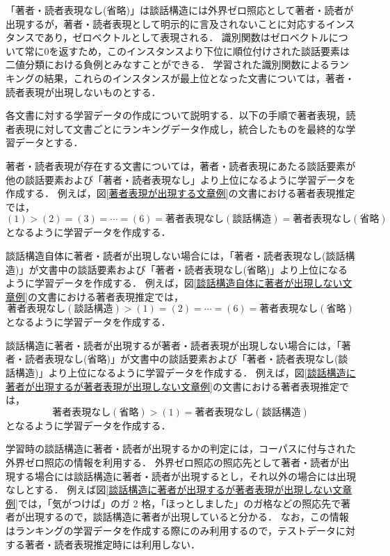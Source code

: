 \documentclass[japanese]{jnlp_1.4}
\begin{document}
「著者・読者表現なし(省略)」は談話構造には外界ゼロ照応として著者・読者が出現するが，著者・読者表現として明示的に言及されないことに対応するインスタンスであり，ゼロベクトルとして表現される．
識別関数はゼロベクトルについて常に$0$を返すため，このインスタンスより下位に順位付けされた談話要素は二値分類における負例とみなすことができる．
学習された識別関数によるランキングの結果，これらのインスタンスが最上位となった文書については，著者・読者表現が出現しないものとする．



各文書に対する学習データの作成について説明する．以下の手順で著者表現，読者表現に対して文書ごとにランキングデータ作成し，統合したものを最終的な学習データとする．

著者・読者表現が存在する文書については，著者・読者表現にあたる談話要素が他の談話要素および「著者・読者表現なし」より上位になるように学習データを作成する．
例えば，図\ref{著者表現が出現する文章例}の文書における著者表現推定では，
\[
 (1) > (2) = (3) = \cdots  = (6) = 著者表現なし(談話構造) = 著者表現なし(省略)
\]
となるように学習データを作成する．

談話構造自体に著者・読者が出現しない場合には，「著者・読者表現なし(談話構造)」が文書中の談話要素および「著者・読者表現なし(省略)」より上位になるように学習データを作成する．
例えば，図\ref{談話構造自体に著者が出現しない文章例}の文書における著者表現推定では，
\[
著者表現なし(談話構造) > (1) = (2) = \cdots = (6) = 著者表現なし(省略)
\]
となるように学習データを作成する．

談話構造に著者・読者が出現するが著者・読者表現が出現しない場合には，「著者・読者表現なし(省略)」が文書中の談話要素および「著者・読者表現なし(談話構造)」より上位になるように学習データを作成する．
例えば，図\ref{談話構造に著者が出現するが著者表現が出現しない文章例}の文書における著者表現推定では，
\[
著者表現なし(省略) > (1) = 著者表現なし(談話構造)
\]
となるように学習データを作成する． 



学習時の談話構造に著者・読者が出現するかの判定には，コーパスに付与された外界ゼロ照応の情報を利用する．
外界ゼロ照応の照応先として著者・読者が出現する場合には談話構造に著者・読者が出現するとし，それ以外の場合には出現なしとする．
例えば図\ref{談話構造に著者が出現するが著者表現が出現しない文章例}では，「気がつけば」のガ 2 格，「ほっとしました」のガ格などの照応先で著者が出現するので，談話構造に著者が出現していると分かる．
なお，この情報はランキングの学習データを作成する際にのみ利用するので，テストデータに対する著者・読者表現推定時には利用しない．
\end{document}
